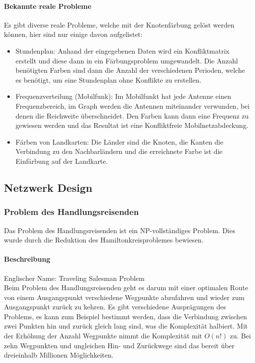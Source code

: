 	\paragraph{Bekannte reale Probleme}	
	Es gibt diverse reale Probleme, welche mit der Knotenfärbung gelöst werden können, hier sind nur einige davon aufgelistet:
	\begin{itemize}
		\item Stundenplan: Anhand der eingegebenen Daten wird ein Konfliktmatrix erstellt und diese dann in ein Färbungsproblem umgewandelt. Die Anzahl benötigten Farben sind dann die Anzahl der verschiedenen Perioden, welche es benötigt, um eine Stundenplan ohne Konflikte zu erstellen. \cite{ieee_exam_table_graph_coloring} \cite{time_table_graph_coloring}
		\item Frequenzverteilung (Mobilfunk): Im Mobilfunkt hat jede Antenne einen Frequenzbereich, im Graph werden die Antennen miteinander verwunden, bei denen die Reichweite überschneidet. Den Farben kann dann eine Frequenz zu gewiesen werden und das Resultat ist eine Konfliktfreie Mobilnetzabdeckung. \cite{seminar_rob_graphen}
		\item Färben von Landkarten: Die Länder sind die Knoten, die Kanten die Verbindung zu den Nachbarländern und die erreichnete Farbe ist die Einfärbung auf der Landkarte. \cite{seminar_rob_graphen}
	\end{itemize}

\newpage
\subsection{Netzwerk Design}\label{network_design}

	\subsubsection{Problem des Handlungsreisenden}\label{tsp}
	Das Problem des Handlungsreisenden ist ein NP-vollständiges Problem. Dies wurde durch die Reduktion des Hamiltonkreisproblemes bewiesen. 

	\paragraph{Beschreibung}
	Englischer Name: Traveling Salesman Problem\\
	Beim Problem des Handlungsreisenden geht es darum mit einer optimalen Route von einem Ausgangspunkt verschiedene Wegpunkte abzufahren und wieder zum Ausgangspunkt zurück zu kehren. Es gibt verschiedene Ausprägungen des Problems, es kann zum Beispiel bestimmt werden, dass die Verbindung zwischen zwei Punkten hin und zurück gleich lang sind, was die Komplexität halbiert. Mit der Erhöhung der Anzahl Wegpunkte nimmt die Komplexität mit $O(n!)$ zu. Bei zehn Wegpunkten und ungleichen Hin- und Zurückwege sind das bereit über dreieinhalb Millionen Möglichkeiten.

